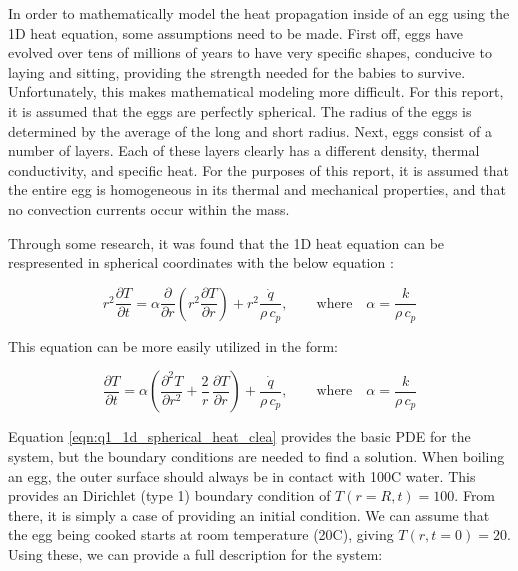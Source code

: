\documentclass[12pt]{article}
\begin{document}
In order to mathematically model the heat propagation inside of an egg using the 1D heat equation, some assumptions need to be made. First off, eggs have evolved over tens of millions of years to have very specific shapes, conducive to laying and sitting, providing the strength needed for the babies to survive. Unfortunately, this makes mathematical modeling more difficult. For this report, it is assumed that the eggs are perfectly spherical. The radius of the eggs is determined by the average of the long and short radius. Next, eggs consist of a number of layers. Each of these layers clearly has a different density, thermal conductivity, and specific heat. For the purposes of this report, it is assumed that the entire egg is homogeneous in its thermal and mechanical properties, and that no convection currents occur within the mass.

Through some research, it was found that the 1D heat equation can be respresented in spherical coordinates with the below equation \cite{spherical_math}:

\begin{equation}
    \label{eqn:q1_1d_spherical_heat}
    r^2 \frac{\partial T}{\partial t} = \alpha \frac{\partial}{\partial r} \left( r^2 \frac{\partial T}{\partial r} \right) + r^2 \frac{\dot q}{\rho \, c_p} , \qquad \text{where} \quad \alpha = \frac{k}{\rho \, c_p}
\end{equation}

\noindent This equation can be more easily utilized in the form:

\begin{equation}
    \label{eqn:q1_1d_spherical_heat_clean}
    \frac{\partial T}{\partial t} = \alpha \left( \frac{\partial^2 T}{\partial r^2} + \frac{2}{r} \, \frac{\partial T}{\partial r} \right) + \frac{\dot q}{\rho \, c_p} , \qquad \text{where} \quad \alpha = \frac{k}{\rho \, c_p}
\end{equation}

Equation \ref{eqn:q1_1d_spherical_heat_clea} provides the basic PDE for the system, but the boundary conditions are needed to find a solution. When boiling an egg, the outer surface should always be in contact with 100\textdegree C water. This provides an Dirichlet (type 1) boundary condition of $T(r=R, t) = 100$. From there, it is simply a case of providing an initial condition. We can assume that the egg being cooked starts at room temperature (20\textdegree C), giving $T(r, t=0) = 20$. Using these, we can provide a full description for the system:
\end{document}

